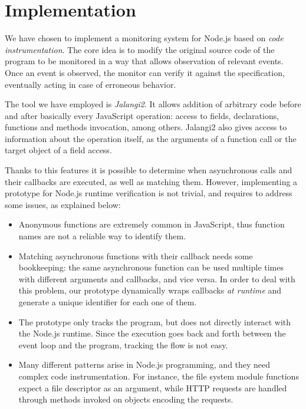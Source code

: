 \section{Implementation}
\label{sec:impl}
We have chosen to implement a monitoring system for Node.js based on \emph{code instrumentation}.
The core idea is to modify the original source code of the program to be monitored in a way that allows observation of relevant events.
Once an event is observed, the monitor can verify it against the specification, eventually acting in case of erroneous behavior.

The tool we have employed is \emph{Jalangi2}.
It allows addition of arbitrary code before and after basically every JavaScript operation: access to fields, declarations, functions and methods invocation, among others. Jalangi2 also gives access to information about the operation itself, as the arguments of a function call or the target object of a field access.

Thanks to this features it is possible to determine when asynchronous calls and their callbacks are executed, as well as matching them.
However, implementing a prototype for Node.js runtime verification is not trivial, and requires to address some issues, as explained below:
\begin{itemize}
\item Anonymous functions are extremely common in JavaScript, thus function names are not a reliable way to identify them.
\item Matching asynchronous functions with their callback needs some bookkeeping: the same asynchronous function can be used multiple times with different arguments and callbacks, and vice versa.
In order to deal with this problem, our prototype dynamically wraps callbacks \emph{at runtime} and generate a unique identifier for each one of them.
\item The prototype only tracks the program, but does not directly interact with the Node.js runtime.
Since the execution goes back and forth between the event loop and the program, tracking the flow is not easy.
\item Many different patterns arise in Node.js programming, and they need complex code instrumentation.
For instance, the file system module functions expect a file descriptor as an argument, while HTTP requests are handled through methods invoked on objects encoding the requests.
\end{itemize}

